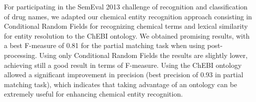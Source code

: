 For participating in the SemEval 2013 challenge of recognition and classification of drug names, we adapted our chemical entity recognition
 approach consisting in Conditional Random Fields for recognizing chemical terms
 and lexical similarity for entity resolution to the ChEBI ontology. We obtained
 promising results, with a best F-measure of 0.81 for the partial matching task
 when using post-processing.
     Using only Conditional Random Fields the results are slightly lower,
 achieving still a good result in terms of F-measure.
     Using the ChEBI ontology allowed a significant improvement in precision
 (best precision of 0.93 in partial matching task), which indicates that taking
 advantage of an ontology can be extremely useful for enhancing chemical entity
 recognition.

